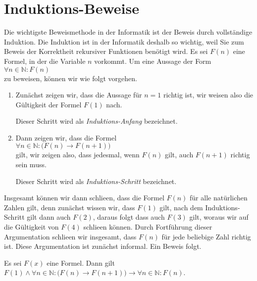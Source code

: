 \section{Induktions-Beweise}
Die wichtigste Beweismethode in der Informatik ist der Beweis durch vollst\"{a}ndige Induktion. 
Die Induktion ist in der Informatik deshalb so wichtig, weil Sie zum Beweis der Korrektheit
rekursiver Funktionen ben\"{o}tigt wird.  Es sei
$F(n)$ eine Formel, in der die Variable $n$ vorkommt.  Um eine Aussage der Form
\\[0.2cm]
\hspace*{1.3cm}
$\forall n \in \mathbb{N}: F(n)$
\\[0.2cm]
zu beweisen, k\"{o}nnen wir wie folgt vorgehen.
\begin{enumerate}
\item Zun\"{a}chst zeigen wir, dass die Aussage f\"{u}r $n=1$ richtig ist, wir weisen also die G\"{u}ltigkeit der
      Formel $F(1)$ nach.

      Dieser Schritt wird als \emph{Induktions-Anfang} bezeichnet.
\item Dann zeigen wir, dass die Formel
      \\[0.2cm]
      \hspace*{1.3cm}
      $\forall n \in \mathbb{N} : \bigl( F(n) \rightarrow F(n+1)\bigr)$
      \\[0.2cm]
      gilt, wir zeigen also, dass jedesmal, wenn $F(n)$ gilt, auch $F(n+1)$ richtig sein muss.

      Dieser Schritt wird als \emph{Induktions-Schritt} bezeichnet.
\end{enumerate}
Insgesamt k\"{o}nnen wir dann schlie\3en, dass die Formel $F(n)$ f\"{u}r alle nat\"{u}rlichen Zahlen gilt, denn
zun\"{a}chst wissen wir, dass $F(1)$ gilt, nach dem Induktions-Schritt gilt dann auch $F(2)$, daraus folgt
dass auch $F(3)$ gilt, woraus wir auf die G\"{u}ltigkeit von $F(4)$ schlie\3en k\"{o}nnen.  Durch Fortf\"{u}hrung
dieser Argumentation schlie\3en wir insgesamt, dass $F(n)$ f\"{u}r jede beliebige Zahl richtig ist.  Diese
Argumentation ist zun\"{a}chst informal. Ein Beweis folgt.

\begin{Satz}
  Es sei $F(x)$ eine Formel. Dann gilt
  \\[0.2cm]
  \hspace*{1.3cm}
  $F(1) \wedge \forall n \in \mathbb{N}:\bigl(F(n) \rightarrow F(n+1)\bigr) \rightarrow 
   \forall n \in \mathbb{N}: F(n)
  $.
\end{Satz}

